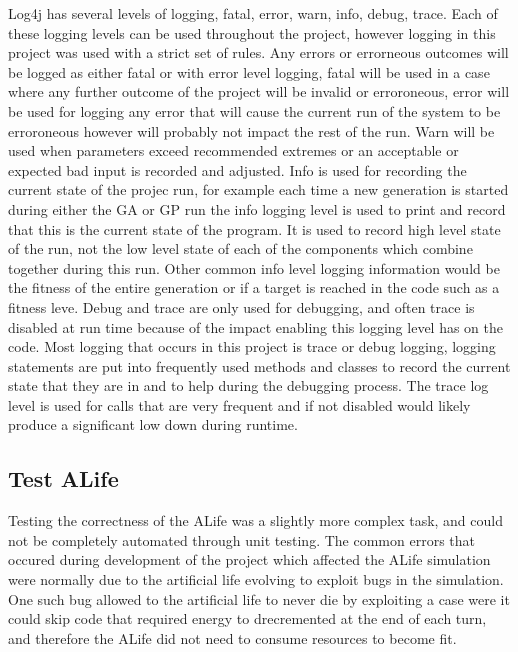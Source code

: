 \documentclass[12pt]{article}
\begin{document}
Log4j has several levels of logging, fatal, error, warn, info, debug, trace. Each of these logging levels can be used throughout
the project, however logging in this project was used with a strict set of rules. Any errors or errorneous outcomes will 
be logged as either fatal or with error level logging, fatal will be used in a case where any further outcome of the project
will be invalid or erroroneous, error will be used for logging any error that will cause the current run of the system to be
erroroneous however will probably not impact the rest of the run. Warn will be used when parameters exceed recommended
extremes or an acceptable or expected bad input is recorded and adjusted. Info is used for recording the current state of
the projec run, for example each time a new generation is started during either the GA or GP run the info logging level is
used to print and record that this is the current state of the program. It is used to record high level state of the run,
not the low level state of each of the components which combine together during this run. Other common info level logging
information would be the fitness of the entire generation or if a target is reached in the code such as a fitness leve.
Debug and trace are only used for debugging, and often trace is disabled at run time because of the impact enabling this
logging level has on the code. Most logging that occurs in this project is trace or debug logging, logging statements are
put into frequently used methods and classes to record the current state that they are in and to help during the debugging
process. The trace log level is used for calls that are very frequent and if not disabled would likely produce a significant
low down during runtime. 

\subsection{Test ALife}

Testing the correctness of the ALife was a slightly more complex task, and could not be completely automated through unit testing.
The common errors that occured during development of the project which affected the ALife simulation were normally due to the
artificial life evolving to exploit bugs in the simulation. One such bug allowed to the artificial life to never die by exploiting
a case were it could skip code that required energy to drecremented at the end of each turn, and therefore the ALife did not need
to consume resources to become fit.
\end{document}
